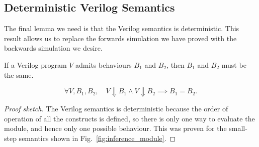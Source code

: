 
\subsection{Deterministic Verilog Semantics}%
\label{sec:proof:deterministic}

The final lemma we need is that the Verilog semantics is deterministic. This
result allows us to replace the forwards simulation we have proved with the
backwards simulation we desire.

\begin{lemma}\label{lemma:deterministic}
  If a Verilog program $V$ admits behaviours $B_1$ and $B_2$, then $B_1$ and
  $B_2$ must be the same.

  \begin{equation*}
    \forall V, B_{1}, B_{2},\quad V \Downarrow B_{1} \land V \Downarrow B_{2} \implies B_{1} = B_{2}.
  \end{equation*}
\end{lemma}

\begin{proof}[Proof sketch]
  The Verilog semantics is deterministic because the order of operation of all
  the constructs is defined, so there is only one way to evaluate the module,
  and hence only one possible behaviour. This was proven for the small-step
  semantics shown in Fig.~\ref{fig:inference_module}.
\end{proof}


